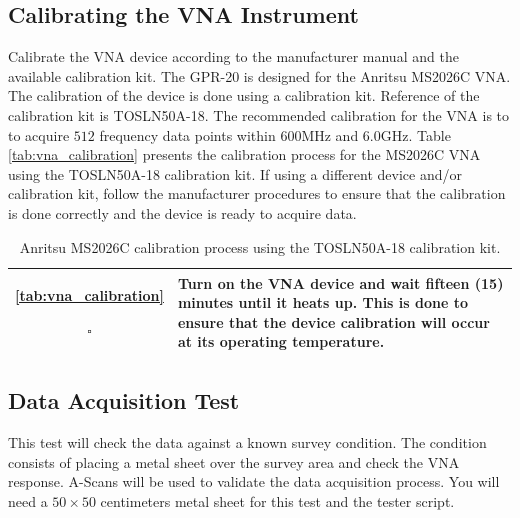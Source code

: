\documentclass{article}
\begin{document}
\subsection{Calibrating the VNA Instrument}
Calibrate the VNA device according to the manufacturer manual and the available calibration kit. The GPR-20 is designed for the Anritsu MS2026C VNA. The calibration of the device is done using a calibration kit. Reference of the calibration kit is TOSLN50A-18. The recommended calibration for the VNA is to to acquire $512$ frequency data points within $600$MHz and $6.0$GHz. Table \ref{tab:vna_calibration} presents the calibration process for the MS2026C VNA using the TOSLN50A-18 calibration kit. If using a different device and/or calibration kit, follow the manufacturer procedures to ensure that the calibration is done correctly and the device is ready to acquire data.

\begin{xltabular}{\textwidth}{|c|X|}

    \endhead
    
    \endfirsthead
    
    \endfoot

    \caption{Anritsu MS2026C calibration process using the TOSLN50A-18 calibration kit.} \ref{tab:vna_calibration}    
    \endlastfoot
    
    $\square$ & Turn on the VNA device and wait fifteen (15) minutes until it heats up. This is done to ensure that the device calibration will occur at its operating temperature. \\ \hline

\end{xltabular}

\subsection{Data Acquisition Test}
This test will check the data against a known survey condition. The condition consists of placing a metal sheet over the survey area and check the VNA response. A-Scans will be used to validate the data acquisition process. You will need a $50\times 50$ centimeters metal sheet for this test and the tester script.
\end{document}
